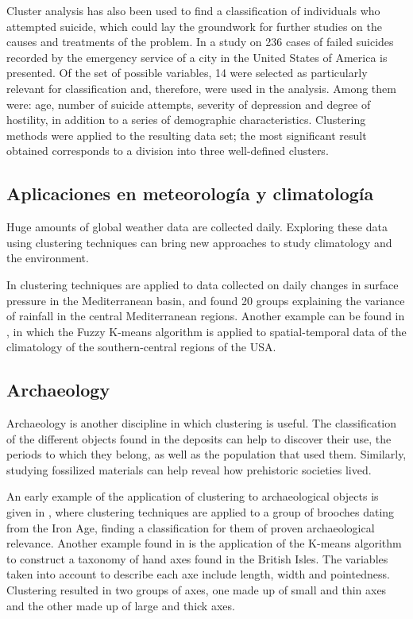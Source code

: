 Cluster analysis has also been used to find a classification of individuals who attempted suicide, which could lay the groundwork for further studies on the causes and treatments of the problem. In \cite{paykel1978classification} a study on 236 cases of failed suicides recorded by the emergency service of a city in the United States of America is presented. Of the set of possible variables, 14 were selected as particularly relevant for classification and, therefore, were used in the analysis. Among them were: age, number of suicide attempts, severity of depression and degree of hostility, in addition to a series of demographic characteristics. Clustering methods were applied to the resulting data set; the most significant result obtained corresponds to a division into three well-defined clusters.

\subsection{Aplicaciones en meteorología y climatología}

Huge amounts of global weather data are collected daily. Exploring these data using clustering techniques can bring new approaches to study climatology and the environment.

In \cite{littmann2000empirical} clustering techniques are applied to data collected on daily changes in surface pressure in the Mediterranean basin, and found 20 groups explaining the variance of rainfall in the central Mediterranean regions. Another example can be found in \cite{liu2005mining}, in which the Fuzzy K-means algorithm is applied to spatial-temporal data of the climatology of the southern-central regions of the USA. 

\subsection{Archaeology}

Archaeology is another discipline in which clustering is useful. The classification of the different objects found in the deposits can help to discover their use, the periods to which they belong, as well as the population that used them. Similarly, studying fossilized materials can help reveal how prehistoric societies lived. 

An early example of the application of clustering to archaeological objects is given in \cite{hodson1966some}, where clustering techniques are applied to a group of brooches dating from the Iron Age, finding a classification for them of proven archaeological relevance. Another example found in \cite{hodson1971numerical} is the application of the K-means algorithm to construct a taxonomy of hand axes found in the British Isles. The variables taken into account to describe each axe include length, width and pointedness. Clustering resulted in two groups of axes, one made up of small and thin axes and the other made up of large and thick axes.

